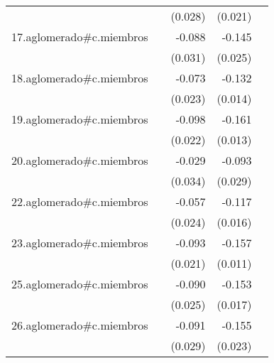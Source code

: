 {\begin{longtable}{l*{4}{D{.}{.}{-1}}}
            &                     &     (0.028)         &     (0.021)         &                     \\
\addlinespace
17.aglomerado#c.miembros&                     &      -0.088\sym{**} &      -0.145\sym{***}&                     \\
            &                     &     (0.031)         &     (0.025)         &                     \\
\addlinespace
18.aglomerado#c.miembros&                     &      -0.073\sym{**} &      -0.132\sym{***}&                     \\
            &                     &     (0.023)         &     (0.014)         &                     \\
\addlinespace
19.aglomerado#c.miembros&                     &      -0.098\sym{***}&      -0.161\sym{***}&                     \\
            &                     &     (0.022)         &     (0.013)         &                     \\
\addlinespace
20.aglomerado#c.miembros&                     &      -0.029         &      -0.093\sym{**} &                     \\
            &                     &     (0.034)         &     (0.029)         &                     \\
\addlinespace
22.aglomerado#c.miembros&                     &      -0.057\sym{*}  &      -0.117\sym{***}&                     \\
            &                     &     (0.024)         &     (0.016)         &                     \\
\addlinespace
23.aglomerado#c.miembros&                     &      -0.093\sym{***}&      -0.157\sym{***}&                     \\
            &                     &     (0.021)         &     (0.011)         &                     \\
\addlinespace
25.aglomerado#c.miembros&                     &      -0.090\sym{***}&      -0.153\sym{***}&                     \\
            &                     &     (0.025)         &     (0.017)         &                     \\
\addlinespace
26.aglomerado#c.miembros&                     &      -0.091\sym{**} &      -0.155\sym{***}&                     \\
            &                     &     (0.029)         &     (0.023)         &                     \\

\end{longtable}}
